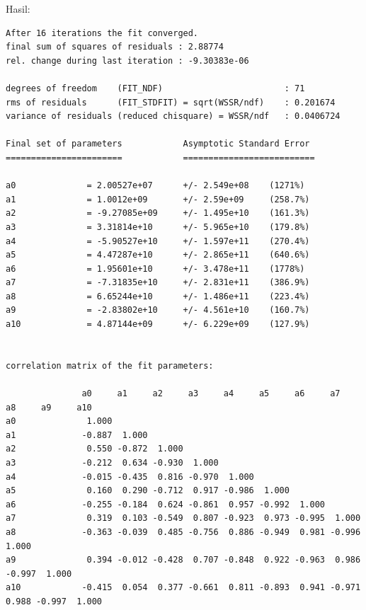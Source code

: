 \documentclass[paper=a4, fontsize=11pt]{scrartcl}
\numberwithin{equation}{section} %
\numberwithin{figure}{section} %
\numberwithin{table}{section} %
\begin{document}
\begin{enumerate}
Hasil:
\begin{small}
\begin{verbatim}
After 16 iterations the fit converged.
final sum of squares of residuals : 2.88774
rel. change during last iteration : -9.30383e-06

degrees of freedom    (FIT_NDF)                        : 71
rms of residuals      (FIT_STDFIT) = sqrt(WSSR/ndf)    : 0.201674
variance of residuals (reduced chisquare) = WSSR/ndf   : 0.0406724

Final set of parameters            Asymptotic Standard Error
=======================            ==========================

a0              = 2.00527e+07      +/- 2.549e+08    (1271%)
a1              = 1.0012e+09       +/- 2.59e+09     (258.7%)
a2              = -9.27085e+09     +/- 1.495e+10    (161.3%)
a3              = 3.31814e+10      +/- 5.965e+10    (179.8%)
a4              = -5.90527e+10     +/- 1.597e+11    (270.4%)
a5              = 4.47287e+10      +/- 2.865e+11    (640.6%)
a6              = 1.95601e+10      +/- 3.478e+11    (1778%)
a7              = -7.31835e+10     +/- 2.831e+11    (386.9%)
a8              = 6.65244e+10      +/- 1.486e+11    (223.4%)
a9              = -2.83802e+10     +/- 4.561e+10    (160.7%)
a10             = 4.87144e+09      +/- 6.229e+09    (127.9%)


correlation matrix of the fit parameters:

               a0     a1     a2     a3     a4     a5     a6     a7     a8     a9     a10    
a0              1.000 
a1             -0.887  1.000 
a2              0.550 -0.872  1.000 
a3             -0.212  0.634 -0.930  1.000 
a4             -0.015 -0.435  0.816 -0.970  1.000 
a5              0.160  0.290 -0.712  0.917 -0.986  1.000 
a6             -0.255 -0.184  0.624 -0.861  0.957 -0.992  1.000 
a7              0.319  0.103 -0.549  0.807 -0.923  0.973 -0.995  1.000 
a8             -0.363 -0.039  0.485 -0.756  0.886 -0.949  0.981 -0.996  1.000 
a9              0.394 -0.012 -0.428  0.707 -0.848  0.922 -0.963  0.986 -0.997  1.000 
a10            -0.415  0.054  0.377 -0.661  0.811 -0.893  0.941 -0.971  0.988 -0.997  1.000 
\end{verbatim}
\end{small}


\end{enumerate}
\end{document}
